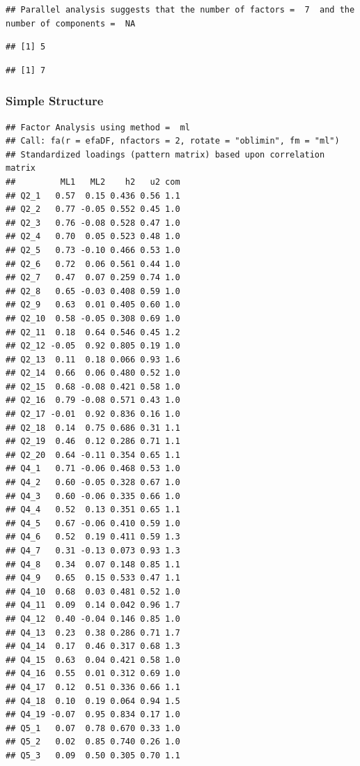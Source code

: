 \documentclass[
  man]{apa6}
\begin{document}
\begin{verbatim}
## Parallel analysis suggests that the number of factors =  7  and the number of components =  NA
\end{verbatim}

\begin{verbatim}
## [1] 5
\end{verbatim}

\begin{verbatim}
## [1] 7
\end{verbatim}

\subsubsection{Simple Structure}\label{simple-structure}

\begin{verbatim}
## Factor Analysis using method =  ml
## Call: fa(r = efaDF, nfactors = 2, rotate = "oblimin", fm = "ml")
## Standardized loadings (pattern matrix) based upon correlation matrix
##         ML1   ML2    h2   u2 com
## Q2_1   0.57  0.15 0.436 0.56 1.1
## Q2_2   0.77 -0.05 0.552 0.45 1.0
## Q2_3   0.76 -0.08 0.528 0.47 1.0
## Q2_4   0.70  0.05 0.523 0.48 1.0
## Q2_5   0.73 -0.10 0.466 0.53 1.0
## Q2_6   0.72  0.06 0.561 0.44 1.0
## Q2_7   0.47  0.07 0.259 0.74 1.0
## Q2_8   0.65 -0.03 0.408 0.59 1.0
## Q2_9   0.63  0.01 0.405 0.60 1.0
## Q2_10  0.58 -0.05 0.308 0.69 1.0
## Q2_11  0.18  0.64 0.546 0.45 1.2
## Q2_12 -0.05  0.92 0.805 0.19 1.0
## Q2_13  0.11  0.18 0.066 0.93 1.6
## Q2_14  0.66  0.06 0.480 0.52 1.0
## Q2_15  0.68 -0.08 0.421 0.58 1.0
## Q2_16  0.79 -0.08 0.571 0.43 1.0
## Q2_17 -0.01  0.92 0.836 0.16 1.0
## Q2_18  0.14  0.75 0.686 0.31 1.1
## Q2_19  0.46  0.12 0.286 0.71 1.1
## Q2_20  0.64 -0.11 0.354 0.65 1.1
## Q4_1   0.71 -0.06 0.468 0.53 1.0
## Q4_2   0.60 -0.05 0.328 0.67 1.0
## Q4_3   0.60 -0.06 0.335 0.66 1.0
## Q4_4   0.52  0.13 0.351 0.65 1.1
## Q4_5   0.67 -0.06 0.410 0.59 1.0
## Q4_6   0.52  0.19 0.411 0.59 1.3
## Q4_7   0.31 -0.13 0.073 0.93 1.3
## Q4_8   0.34  0.07 0.148 0.85 1.1
## Q4_9   0.65  0.15 0.533 0.47 1.1
## Q4_10  0.68  0.03 0.481 0.52 1.0
## Q4_11  0.09  0.14 0.042 0.96 1.7
## Q4_12  0.40 -0.04 0.146 0.85 1.0
## Q4_13  0.23  0.38 0.286 0.71 1.7
## Q4_14  0.17  0.46 0.317 0.68 1.3
## Q4_15  0.63  0.04 0.421 0.58 1.0
## Q4_16  0.55  0.01 0.312 0.69 1.0
## Q4_17  0.12  0.51 0.336 0.66 1.1
## Q4_18  0.10  0.19 0.064 0.94 1.5
## Q4_19 -0.07  0.95 0.834 0.17 1.0
## Q5_1   0.07  0.78 0.670 0.33 1.0
## Q5_2   0.02  0.85 0.740 0.26 1.0
## Q5_3   0.09  0.50 0.305 0.70 1.1

\end{verbatim}
\end{document}
